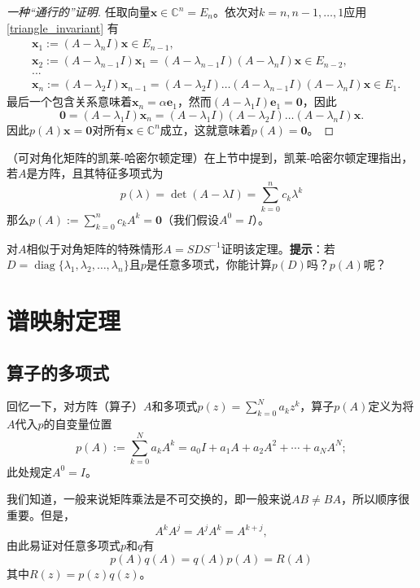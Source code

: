 \begin{proof}[一种“通行的”证明]
    任取向量$\mathbf{x}\in\mathbb{C}^n= E_n$。依次对$k=n,n-1,\dots,1$应用 \eqref{triangle_invariant} 有
    \[\begin{aligned}
        &\mathbf{x}_{1}:=(A-\lambda_{n}I)\mathbf{x}\in E_{n-1},\\
        &\mathbf{x}_{2}:=(A-\lambda_{n-1}I)\mathbf{x}_1=(A-\lambda_{n-1}I)(A-\lambda_{n}I)\mathbf{x}\in E_{n-2},\\&\mathrm{...}\\
        &\mathbf{x}_{n}:=(A-\lambda_{2}I)\mathbf{x}_{n-1}=(A-\lambda_{2}I)\ldots(A-\lambda_{n-1}I)(A-\lambda_{n}I)\mathbf{x}\in E_{1}.
    \end{aligned}\]
    最后一个包含关系意味着$\mathbf{x}_{n}=\alpha \mathbf{e}_1$，然而$(A-\lambda_1 I)\mathbf{e}_1=\mathbf{0}$，因此\[\mathbf{0}=(A-\lambda_{1}I)\mathbf{x}_{n}=(A-\lambda_{1}I)(A-\lambda_{2}I)\ldots(A-\lambda_{n}I)\mathbf{x}.\]
    因此$p(A)\mathbf{x}=\mathbf{0}$对所有$\mathbf{x}\in\mathbb{C}^n$成立，这就意味着$p(A)=\mathbf{0}$。
\end{proof}

\begin{problemset}
    \item \label{ex:9_1_1} （可对角化矩阵的凯莱-哈密尔顿定理）在上节中提到，凯莱-哈密尔顿定理指出，若$A$是方阵，且其特征多项式为\[p(\lambda)=\det(A-\lambda I)=\sum_{k=0}^nc_k\lambda^k\]那么$p(A):=\sum_{k=0}^nc_kA^k=\mathbf{0}$（我们假设$A^0=I$）。
    
    对$A$相似于对角矩阵的特殊情形$A=SDS^{-1}$证明该定理。{\bf 提示}：若$D=\operatorname{diag}\{\lambda_1,\lambda_2,\dots,\lambda_n\}$且$p$是任意多项式，你能计算$p(D)$吗？$p(A)$呢？
\end{problemset}

\section{谱映射定理}

\subsection{算子的多项式}\label{subsec:poly_of_operator}

回忆一下，对方阵（算子）$A$和多项式$p(z)=\sum_{k=0}^{N}a_kz^k$，算子$p(A)$定义为将$A$代入$p$的自变量位置
\[p(A):=\sum_{k=0}^Na_kA^k=a_0I+a_1A+a_2A^2+\cdots+a_NA^N;\]
此处规定$A^0=I$。

我们知道，一般来说矩阵乘法是不可交换的，即一般来说$AB\ne BA$，所以顺序很重要。但是，
\[A^kA^j=A^jA^k=A^{k+j},\]
由此易证对任意多项式$p$和$q$有\[p(A)q(A)=q(A)p(A)=R(A)\]
其中$R(z)=p(z)q(z)$。

